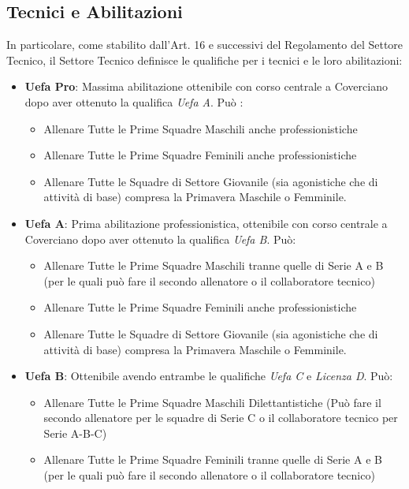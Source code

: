 \documentclass[../uefaC.tex]{subfiles}
\begin{document}
\subsection{Tecnici e Abilitazioni}
In particolare, come stabilito dall'Art. 16 e successivi del Regolamento del Settore Tecnico, il Settore Tecnico definisce le qualifiche per i tecnici e le loro abilitazioni:
\begin{itemize}
    \item\textbf{Uefa Pro}: Massima abilitazione ottenibile con corso centrale a Coverciano dopo aver ottenuto la qualifica \emph{Uefa A}. Può :
        \begin{itemize}
            \item Allenare Tutte le Prime Squadre Maschili anche professionistiche
            \item Allenare Tutte le Prime Squadre Feminili anche professionistiche
            \item Allenare Tutte le Squadre di Settore Giovanile (sia agonistiche che di attività di base) compresa la Primavera Maschile o Femminile.
        \end{itemize}
    \item\textbf{Uefa A}: Prima abilitazione professionistica, ottenibile con corso centrale a Coverciano dopo aver ottenuto la qualifica \emph{Uefa B}. Può:
        \begin{itemize}
            \item Allenare Tutte le Prime Squadre Maschili tranne quelle di Serie A e B (per le quali può fare il secondo allenatore o il collaboratore tecnico)
            \item Allenare Tutte le Prime Squadre Feminili anche professionistiche
            \item Allenare Tutte le Squadre di Settore Giovanile (sia agonistiche che di attività di base) compresa la Primavera Maschile o Femminile.
        \end{itemize}
    \item\textbf{Uefa B}: Ottenibile avendo entrambe le qualifiche \emph{Uefa C} e \emph{Licenza D}. Può:
        \begin{itemize}
            \item Allenare Tutte le Prime Squadre Maschili Dilettantistiche (Può fare il secondo allenatore per le squadre di Serie C o il collaboratore tecnico per Serie A-B-C)
            \item Allenare Tutte le Prime Squadre Feminili tranne quelle di Serie A e B (per le quali può fare il secondo allenatore o il collaboratore tecnico)

\end{itemize}
\end{itemize}
\end{document}
